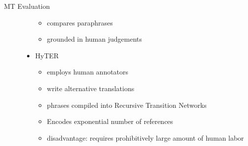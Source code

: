 \begin{block}{MT Evaluation}
\begin{description}
\begin{itemize}
\begin{itemize}
\item 
compares paraphrases
\item 
grounded in human judgements
\end{itemize}
\item 
HyTER
\begin{itemize}
\item 
employs human annotators
\item 
write alternative translations 
\item 
phrases  compiled into Recursive Transition Networks
\item 
Encodes  exponential number of references
\item 
disadvantage: 
requires  prohibitively large amount of human labor 
\end{itemize}
\end{itemize}
\end{description}
\end{block}


